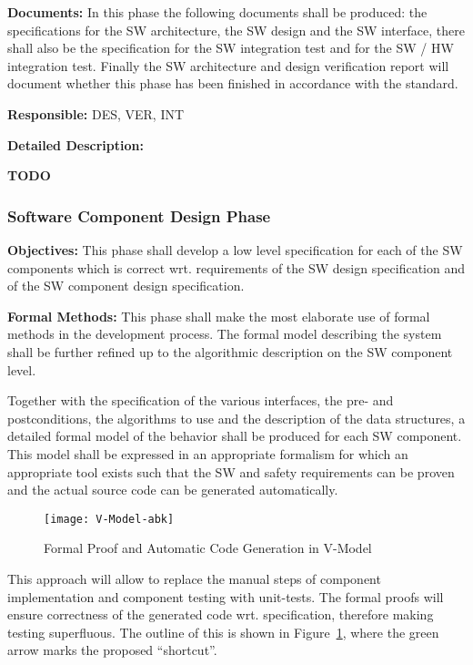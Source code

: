 {\bf Documents:} In this phase the following documents shall be produced: the
specifications for the SW architecture, the SW design and the SW interface,
there shall also be the specification for the SW integration test and for the SW
/ HW integration test. Finally the SW architecture and design verification
report will document whether this phase has been finished in accordance with
the standard.

{\bf Responsible:} DES, VER, INT

{\bf Detailed Description:}

{\Huge \bf TODO}

\subsubsection{Software Component Design Phase}
\label{sec:softw-comp-design}

{\bf Objectives:} This phase shall develop a low level specification for each of
the SW components which is correct wrt. requirements of the SW design
specification and of the SW component design specification.

{\bf Formal Methods:} This phase shall make the most elaborate use of formal
methods in the development process. The formal model describing the system shall
be further refined up to the algorithmic description on the SW component level.

Together with the specification of the various interfaces, the pre- and
postconditions, the algorithms to use and the description of the data
structures, a detailed formal model of the behavior shall be produced for each
SW component. This model shall be expressed in an appropriate formalism for
which an appropriate tool exists such that the SW and safety requirements can be
proven and the actual source code can be generated automatically.

\begin{figure}[ht]
  \centering
  \texttt{[image: V-Model-abk]}
  \caption{Formal Proof and Automatic Code Generation in V-Model}
  \label{fig:proof-code-generation}
\end{figure}

This approach will allow to replace the manual steps of component implementation
and component testing with unit-tests. The formal proofs will ensure correctness
of the generated code wrt. specification, therefore making testing
superfluous. The outline of this is shown in
Figure~\ref{fig:proof-code-generation}, where the green arrow marks the proposed
``shortcut''.

